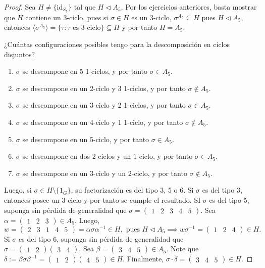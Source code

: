 \documentclass[11pt,twoside]{article}
\newcounter{result}[subsection]
\begin{document}
\begin{proof}
Sea $H \neq \{ \mathrm{id}_{S_{5}} \}$ tal que $H \triangleleft A_{5}$. Por los ejercicios anteriores, basta mostrar que $H$ contiene un 3-ciclo, pues si $\sigma \in H$ es un 3-ciclo, $\sigma^{A_{5}} \subseteq H$ pues $H \triangleleft A_{5}$, entonces $\langle \sigma^{A_{5}}  \rangle = \{ \tau: \tau \text{ es 3-ciclo}  \} \subseteq H$ y por tanto $H = A_{5}$.

¿Cuántas configuraciones posibles tengo para la descomposición en ciclos disjuntos?
\begin{enumerate}[label=(\arabic*)]
\item $\sigma$ se descompone en 5 1-ciclos, y por tanto $\sigma \in A_{5}$.
\item $\sigma$ se descompone en un 2-ciclo y 3 1-ciclos, y por tanto $\sigma \not\in A_{5}$.
\item $\sigma$ se descompone en un 3-ciclo y 2 1-ciclos, y por tanto $\sigma \in A_{5}$.
\item $\sigma$ se descompone en un 4-ciclo y 1 1-ciclo, y por tanto $\sigma \not\in A_{5}$.
\item $\sigma$ se descompone en un 5-ciclo, y por tanto $\sigma \in A_{5}$.
\item $\sigma$ se descompone en dos 2-ciclos y un 1-ciclo, y por tanto $\sigma \in A_{5}$.
\item $\sigma$ se descompone en un 3-ciclo y un 2-ciclo, y por tanto $\sigma \not\in A_{5}$.
\end{enumerate}
Luego, si $\sigma \in H \setminus \{ 1_{G} \}$, su factorización es del tipo 3, 5 o 6. Si $\sigma$ es del tipo 3, entonces posee un 3-ciclo y por tanto se cumple el resultado.
SI $\sigma$ es del tipo 5, suponga sin pérdida de generalidad que $\sigma = \begin{pmatrix}1 & 2 & 3 & 4 & 5\end{pmatrix}$. Sea $\alpha = \begin{pmatrix}1 & 2 & 3\end{pmatrix} \in A_{5}$. Luego,
\[
w = \begin{pmatrix}
2 & 3 & 1 & 4 & 5
\end{pmatrix} =\alpha \sigma \alpha^{-1} \in H, \text{ pues }H \triangleleft A_{5} \implies w \sigma ^{-1} = \begin{pmatrix}
1 & 2 & 4
\end{pmatrix} \in H.
\]
Si $\sigma$ es del tipo 6, suponga sin pérdida de generalidad que $\sigma = \begin{pmatrix}1 & 2\end{pmatrix}\begin{pmatrix}3 & 4\end{pmatrix}$. Sea $\beta = \begin{pmatrix}3 & 4 & 5\end{pmatrix} \in A_{5}$. Note que $\delta :=\beta \sigma \beta ^{-1} = \begin{pmatrix}1 & 2\end{pmatrix}\begin{pmatrix}4 & 5\end{pmatrix} \in H$. Finalmente, $\sigma \cdot \delta = \begin{pmatrix}3 & 4 & 5\end{pmatrix} \in H$.

\end{proof}
\end{document}
